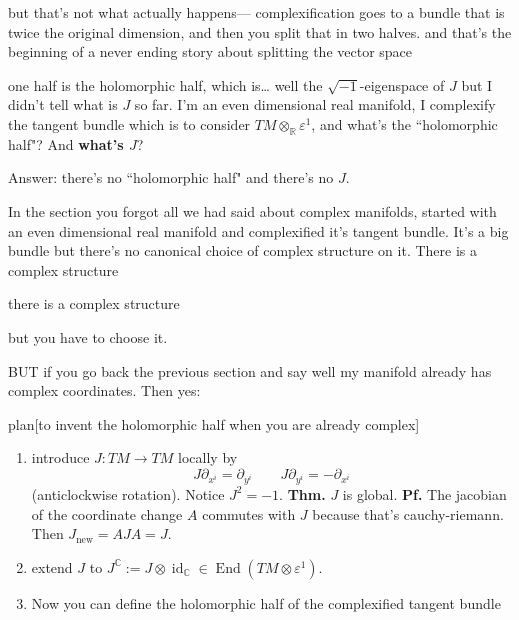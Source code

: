 but that's not what actually happens--- complexification goes to a bundle that is twice the original dimension, and then you split that in two halves. and that's the beginning of a never ending story about splitting the vector space

one half is the holomorphic half, which is… well the \(\sqrt{-1}\)-eigenspace of \(J\) but I didn't tell what is \(J\) so far. I'm an even dimensional real manifold, I complexify the tangent bundle which is to consider \(TM \otimes_\mathbb{R} \varepsilon^1\), and what's the ``holomorphic half"? And \textbf{what's \(J\)}?

Answer: there's no ``holomorphic half" and there's no \(J\).

In the section you forgot all we had said about complex manifolds, started with an even dimensional real manifold and complexified it's tangent bundle. It's a big bundle but there's no canonical choice of complex structure on it. There is a complex structure
\begin{thm}\leavevmode
there is a complex structure
\end{thm}
but you have to choose it.

BUT if you go back the previous section and say well my manifold already has complex coordinates. Then yes:
\begin{thing6}{plan}[to invent the holomorphic half when you are already complex]\leavevmode
\begin{enumerate}[label=\textbf{Step \arabic*}]
\item introduce \(J:TM \to TM\) locally by
\[J \partial_{x^i}=\partial_{y^i} \qquad J\partial_{y^i}=-\partial_{x^i}\]
(anticlockwise rotation). Notice \(J^2 =-1\). \textbf{Thm.} \(J\) is global. \textbf{Pf.} The jacobian of the coordinate change \(A\) commutes with \(J\) because that's cauchy-riemann. Then \(J_{\operatorname{new}}=A J A=J\).
\item extend \(J\) to \(J^\mathbb{C}:=J \otimes \operatorname{id}_\mathbb{C}\in \operatorname{End}(TM \otimes \varepsilon^1)\).
\item Now you can define the holomorphic half of the complexified tangent bundle
\end{enumerate}
\end{thing6}

